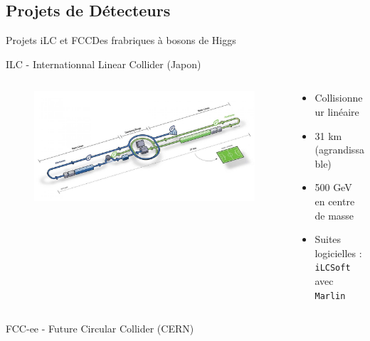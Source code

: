 \documentclass[9pt]{beamer}
\begin{document}
\subsection{Projets de Détecteurs}
\begin{frame}{Projets iLC et FCC}{Des frabriques à bosons de Higgs}

    \begin{block}{ILC - Internationnal Linear Collider (Japon)}
        \begin{columns}
		
            \begin{column}{0.45\textwidth}
                    \begin{figure}
                        \includegraphics[width=\textwidth]{../img/ilc.jpg}
                    \end{figure}
            \end{column}
        
            \begin{column}{0.45\textwidth}
                    \begin{itemize}
                    \item Collisionneur linéaire 
                    \item 31 km (agrandissable)
                    \item 500 GeV en centre de masse
                    \item Suites logicielles : \texttt{iLCSoft} avec \texttt{Marlin}
                \end{itemize}
            \end{column}
        
        \end{columns}
    \end{block}
    
    \begin{block}{FCC-ee - Future Circular Collider (CERN)}
        \begin{columns}
        

\end{columns}
\end{block}
\end{frame}
\end{document}
